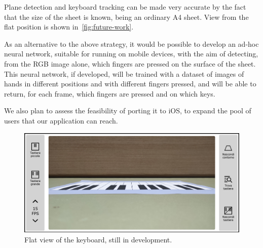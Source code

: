 Plane detection and keyboard tracking can be made very accurate by the fact that the size of the sheet is known,
being an ordinary A4 sheet.
View from the flat position is shown in~\autoref{fig:future-work}.

As an alternative to the above strategy, it would be possible to develop an ad-hoc neural network,
suitable for running on mobile devices, with the aim of detecting, from the RGB image alone,
which fingers are pressed on the surface of the sheet.
This neural network, if developed, will be trained with a dataset of images of hands in different positions and with
different fingers pressed, and will be able to return, for each frame, which fingers are pressed and on which keys.

We also plan to assess the feasibility of porting it to iOS, to expand the pool of users that our application can reach.

\begin{figure}[ht]
	\centering
	\includegraphics[width=\textwidth]{images/application/screenshots/playing-phase-flat}
	\caption{Flat view of the keyboard, still in development.}
	\label{fig:future-work}
\end{figure}
